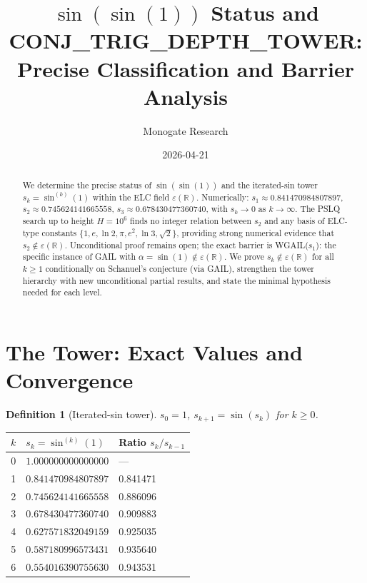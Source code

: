 \documentclass[11pt]{article}
\title{$\sin(\sin(1))$ Status and CONJ\_TRIG\_DEPTH\_TOWER:\\
Precise Classification and Barrier Analysis}
\author{Monogate Research}
\date{2026-04-21}
\newtheorem{definition}[theorem]{Definition}
\begin{document}
\maketitle

\begin{abstract}
We determine the precise status of $\sin(\sin(1))$ and the iterated-sin tower
$s_k = \sin^{(k)}(1)$ within the ELC field $\varepsilon(\mathbb{R})$.
Numerically: $s_1 \approx 0.841470984807897$, $s_2 \approx 0.745624141665558$,
$s_3 \approx 0.678430477360740$, with $s_k \to 0$ as $k \to \infty$.
The PSLQ search up to height $H = 10^6$ finds no integer relation between $s_2$
and any basis of ELC-type constants $\{1, e, \ln 2, \pi, e^2, \ln 3, \sqrt{2}\}$,
providing strong numerical evidence that $s_2 \notin \varepsilon(\mathbb{R})$.
Unconditional proof remains open; the exact barrier is WGAIL($s_1$):
the specific instance of GAIL with $\alpha = \sin(1) \notin \varepsilon(\mathbb{R})$.
We prove $s_k \notin \varepsilon(\mathbb{R})$ for all $k \geq 1$
conditionally on Schanuel's conjecture (via GAIL),
strengthen the tower hierarchy with new unconditional
partial results, and state the minimal hypothesis needed for each level.
\end{abstract}

\section{The Tower: Exact Values and Convergence}

\begin{definition}[Iterated-sin tower]
$s_0 = 1$, $s_{k+1} = \sin(s_k)$ for $k \geq 0$.
\end{definition}

\begin{center}
\renewcommand{\arraystretch}{1.2}
\begin{tabular}{cll}
\toprule
$k$ & $s_k = \sin^{(k)}(1)$ & Ratio $s_k / s_{k-1}$ \\
\midrule
0 & $1.000000000000000$ & --- \\
1 & $0.841470984807897$ & 0.841471 \\
2 & $0.745624141665558$ & 0.886096 \\
3 & $0.678430477360740$ & 0.909883 \\
4 & $0.627571832049159$ & 0.925035 \\
5 & $0.587180996573431$ & 0.935640 \\
6 & $0.554016390755630$ & 0.943531 \\
\bottomrule
\end{tabular}
\end{center}
\end{document}
